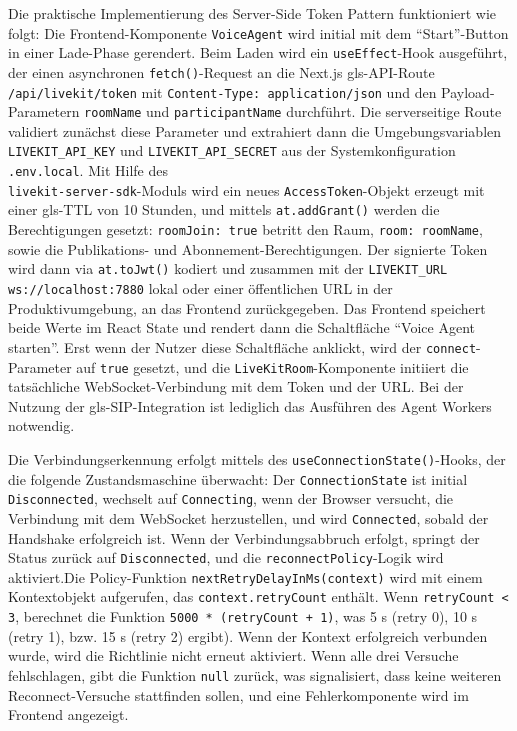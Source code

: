 \noindent Die praktische Implementierung des Server-Side Token Pattern funktioniert wie folgt: Die Frontend-Komponente \texttt{VoiceAgent} wird initial mit dem ``Start''-Button in einer Lade-Phase gerendert. Beim Laden wird ein \texttt{useEffect}-Hook ausgeführt, der einen asynchronen \texttt{fetch()}-Request an die Next.js \gls{gls-API}-Route \texttt{/api/livekit/token} mit \texttt{Content-Type: application/json} und den Payload-Parametern \texttt{roomName} und \texttt{participantName} durchführt. Die serverseitige Route validiert zunächst diese Parameter und extrahiert dann die Umgebungsvariablen \texttt{LIVEKIT\_API\_KEY} und \texttt{LIVEKIT\_API\_SECRET} aus der Systemkonfiguration \texttt{.env.local}. Mit Hilfe des\\ \texttt{livekit-server-sdk}-Moduls wird ein neues \texttt{AccessToken}-Objekt erzeugt mit einer \gls{gls-TTL} von 10 Stunden, und mittels \texttt{at.addGrant()} werden die Berechtigungen gesetzt: \texttt{roomJoin: true} betritt den Raum, \texttt{room: roomName}, sowie die Publikations- und Abonnement-Berechtigungen. Der signierte Token wird dann via \texttt{at.toJwt()} kodiert und zusammen mit der \texttt{LIVEKIT\_URL} \texttt{ws://localhost:7880} lokal oder einer öffentlichen URL in der Produktivumgebung, an das Frontend zurückgegeben. Das Frontend speichert beide Werte im React State und rendert dann die Schaltfläche ``Voice Agent starten''. Erst wenn der Nutzer diese Schaltfläche anklickt, wird der \texttt{connect}-Parameter auf \texttt{true} gesetzt, und die \texttt{LiveKitRoom}-Komponente initiiert die tatsächliche WebSocket-Verbindung mit dem Token und der URL. Bei der Nutzung der \gls{gls-SIP}-Integration ist lediglich das Ausführen des Agent Workers notwendig.

\noindent Die Verbindungserkennung erfolgt mittels des \texttt{useConnectionState()}-Hooks, der die folgende Zustandsmaschine überwacht: Der \texttt{ConnectionState} ist initial \texttt{Disconnected}, wechselt auf \texttt{Connecting}, wenn der Browser versucht, die Verbindung mit dem WebSocket herzustellen, und wird \texttt{Connected}, sobald der Handshake erfolgreich ist. Wenn der Verbindungsabbruch erfolgt, springt der Status zurück auf \texttt{Disconnected}, und die \texttt{reconnectPolicy}-Logik wird aktiviert.\newline Die Policy-Funktion \texttt{nextRetryDelayInMs(context)} wird mit einem Kontextobjekt aufgerufen, das \texttt{context.retryCount} enthält. Wenn \texttt{retryCount < 3}, berechnet die Funktion \texttt{5000 * (retryCount + 1)}, was 5 s (retry 0), 10 s (retry 1), bzw. 15 s (retry 2) ergibt). Wenn der Kontext erfolgreich verbunden wurde, wird die Richtlinie nicht erneut aktiviert. Wenn alle drei Versuche fehlschlagen, gibt die Funktion \texttt{null} zurück, was signalisiert, dass keine weiteren Reconnect-Versuche stattfinden sollen, und eine Fehlerkomponente wird im Frontend angezeigt.

